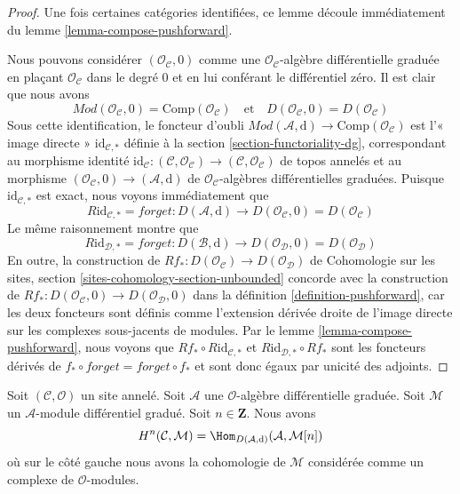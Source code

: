 \begin{proof}
Une fois certaines catégories identifiées, ce lemme découle immédiatement
du lemme \ref{lemma-compose-pushforward}.

\medskip\noindent
Nous pouvons considérer $(\mathcal{O}_\mathcal{C}, 0)$ comme une
$\mathcal{O}_\mathcal{C}$-algèbre différentielle graduée en plaçant $\mathcal{O}_\mathcal{C}$
dans le degré $0$ et en lui conférant le différentiel zéro.
Il est clair
que nous avons $$
\textit{Mod}(\mathcal{O}_\mathcal{C},
0) = \text{Comp}(\mathcal{O}_\mathcal{C})
\quad\text{et}\quad
D(\mathcal{O}_\mathcal{C}, 0) = D(\mathcal{O}_\mathcal{C})
$$
Sous cette identification, le foncteur
d'oubli $\textit{Mod}(\mathcal{A}, \text{d}) \to
\text{Comp}(\mathcal{O}_\mathcal{C})$
est l'« image directe » $\text{id}_{\mathcal{C}, *}$
définie à la section \ref{section-functoriality-dg},
correspondant au morphisme identité
$\text{id}_\mathcal{C} : (\mathcal{C}, \mathcal{O}_\mathcal{C}) \to
(\mathcal{C}, \mathcal{O}_\mathcal{C})$ de topos annelés et au morphisme
$(\mathcal{O}_\mathcal{C}, 0) \to (\mathcal{A}, \text{d})$ de
$\mathcal{O}_\mathcal{C}$-algèbres différentielles graduées.
Puisque $\text{id}_{\mathcal{C}, *}$ est exact, nous voyons immédiatement
que $$
R\text{id}_{\mathcal{C}, *} = forget
: D(\mathcal{A}, \text{d}) \longrightarrow
D(\mathcal{O}_\mathcal{C}, 0) = D(\mathcal{O}_\mathcal{C})
$$
Le même raisonnement montre que
$$
R\text{id}_{\mathcal{D}, *} = forget :
D(\mathcal{B}, \text{d}) \longrightarrow
D(\mathcal{O}_\mathcal{D}, 0) = D(\mathcal{O}_\mathcal{D})
$$ En outre,
la construction de
$Rf_* : D(\mathcal{O}_\mathcal{C}) \to D(\mathcal{O}_\mathcal{D})$ de Cohomologie
sur les sites, section \ref{sites-cohomology-section-unbounded} concorde avec
la construction de
$Rf_* : D(\mathcal{O}_\mathcal{C}, 0) \to D(\mathcal{O}_\mathcal{D}, 0)$ dans la définition
\ref{definition-pushforward}, car les deux
foncteurs sont définis comme l'extension dérivée droite de l'image
directe sur les complexes sous-jacents de modules.
Par le lemme \ref{lemma-compose-pushforward}, nous voyons
que $Rf_* \circ R\text{id}_{\mathcal{C}, *}$
et $R\text{id}_{\mathcal{D}, *} \circ Rf_*$ sont les foncteurs dérivés
de $f_* \circ forget = forget \circ f_*$ et sont donc égaux
par unicité des adjoints.
\end{proof}

\begin{lemma}
\label{lemma-cohomology-ext}
Soit $(\mathcal{C}, \mathcal{O})$ un site annelé. Soit
$\mathcal{A}$ une $\mathcal{O}$-algèbre différentielle graduée. Soit
$\mathcal{M}$ un $\mathcal{A}$-module différentiel gradué. Soit
$n \in \mathbf{Z}$. Nous avons
$$
H^n(\mathcal{C}, \mathcal{M}) =
\Hom_{D(\mathcal{A}, \text{d})}(\mathcal{A}, \mathcal{M}[n])
$$ où
sur le côté gauche nous avons la cohomologie de $\mathcal{M}$ considérée
comme un complexe de $\mathcal{O}$-modules.
\end{lemma}

